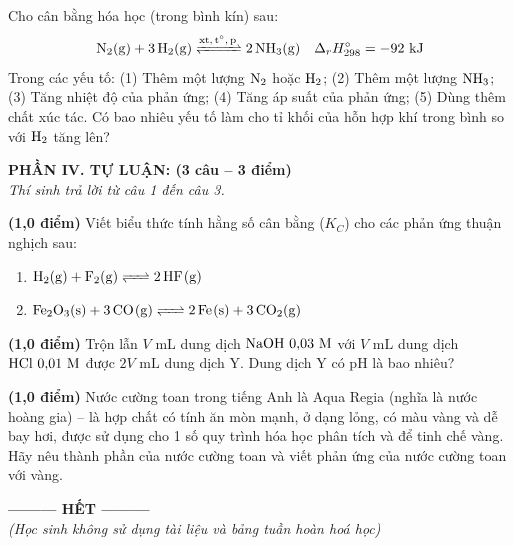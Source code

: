 \documentclass[12pt,a4paper]{article}
\begin{document}
\begin{ex}
Cho cân bằng hóa học (trong bình kín) sau:
\[ \ce{N2(g) + 3H2(g) <=>[xt, t^\circ, p] 2NH3(g)} \quad \Delta_r H_{298}^\circ = -92\text{ kJ} \]
Trong các yếu tố: (1) Thêm một lượng $\ce{N2}$ hoặc $\ce{H2}$; (2) Thêm một lượng $\ce{NH3}$; (3) Tăng nhiệt độ của phản ứng; (4) Tăng áp suất của phản ứng; (5) Dùng thêm chất xúc tác. Có bao nhiêu yếu tố làm cho tỉ khối của hỗn hợp khí trong bình so với $\ce{H2}$ tăng lên?
\shortans{}
\loigiai{}
\end{ex}

\bigskip
\noindent
\textbf{PHẦN IV. TỰ LUẬN: (3 câu -- 3 điểm)}\\
\textit{Thí sinh trả lời từ câu 1 đến câu 3.}

\begin{ex}
\textbf{(1,0 điểm)} Viết biểu thức tính hằng số cân bằng ($K_C$) cho các phản ứng thuận nghịch sau:
\begin{enumerate}[(1)]
	\item $\ce{H2(g) + F2(g) <=> 2HF(g)}$
	\item $\ce{Fe2O3(s) + 3CO(g) <=> 2Fe(s) + 3CO2(g)}$
\end{enumerate}
\loigiai{}
\vspace*{3.5cm}
\end{ex}

\begin{ex}
\textbf{(1,0 điểm)} Trộn lẫn $V\text{ mL}$ dung dịch $\ce{NaOH}\ 0{,}03\text{ M}$ với $V\text{ mL}$ dung dịch $\ce{HCl}\ 0{,}01\text{ M}$ được $2V\text{ mL}$ dung dịch Y. Dung dịch Y có pH là bao nhiêu?
\loigiai{}
\vspace*{4.5cm}
\end{ex}

\begin{ex}
\textbf{(1,0 điểm)} Nước cường toan trong tiếng Anh là Aqua Regia (nghĩa là nước hoàng gia) -- là hợp chất có tính ăn mòn mạnh, ở dạng lỏng, có màu vàng và dễ bay hơi, được sử dụng cho 1 số quy trình hóa học phân tích và để tinh chế vàng. Hãy nêu thành phần của nước cường toan và viết phản ứng của nước cường toan với vàng.
\loigiai{}
\vspace*{4.5cm}
\end{ex}

\begin{center}
\textbf{--------- HẾT ---------}\\
\textit{(Học sinh không sử dụng tài liệu và bảng tuần hoàn hoá học)}
\end{center}
\end{document}
